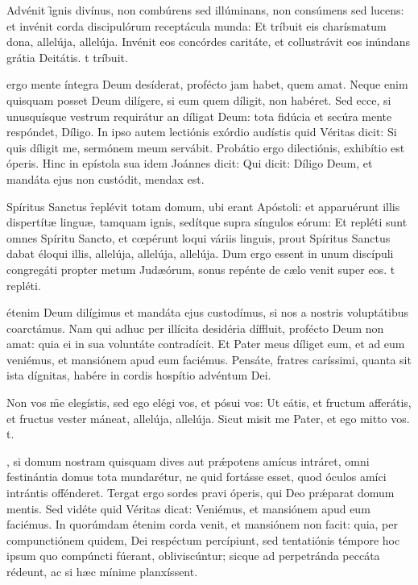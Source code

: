 \documentclass[fontsize=9pt,paper=A6,twoside,BCOR=1mm,DIV=22,headinclude]{scrarticle}
\begin{document}
\begin{multicols}{2}
\R Advénit \f ignis divínus, non combúrens sed illúminans, non consúmens sed lucens: et invénit corda discipulórum receptácula munda:
\red{*} Et tríbuit eis charísmatum dona, allelúja, allelúja.
\V Invénit eos concórdes caritáte, et collustrávit eos inúndans grátia Deitátis.
t tríbuit.

 ergo mente íntegra Deum desíderat, profécto jam habet, quem amat. Neque enim quisquam posset Deum dilígere, si eum quem díligit, non habéret. Sed ecce, si unusquísque vestrum requirátur an díligat Deum: tota fidúcia et secúra mente respóndet, Díligo. In ipso autem lectiónis exórdio audístis quid Véritas dicit: Si quis díligit me, sermónem meum servábit. Probátio ergo dilectiónis, exhibítio est óperis. Hinc in epístola sua idem Joánnes dicit: Qui dicit: Díligo Deum, et mandáta ejus non custódit, mendax est.

\R Spíritus Sanctus \f replévit totam domum, ubi erant Apóstoli: et apparuérunt illis dispertítæ linguæ, tamquam ignis, sedítque supra síngulos eórum:
\red{*} Et repléti sunt omnes Spíritu Sancto, et cœpérunt loqui váriis linguis, prout Spíritus Sanctus dabat éloqui illis, allelúja, allelúja, allelúja.
\V Dum ergo essent in unum discípuli congregáti propter metum Judæórum, sonus repénte de cælo venit super eos.
t repléti.

 étenim Deum dilígimus et mandáta ejus custodímus, si nos a nostris voluptátibus coarctámus. Nam qui adhuc per illícita desidéria díffluit, profécto Deum non amat: quia ei in sua voluntáte contradícit. Et Pater meus díliget eum, et ad eum veniémus, et mansiónem apud eum faciémus. Pensáte, fratres caríssimi, quanta sit ista dígnitas, habére in cordis hospítio advéntum Dei.

\R Non vos \f me elegístis, sed ego elégi vos, et pósui vos:
\red{*} Ut eátis, et fructum afferátis, et fructus vester máneat, allelúja, allelúja.
\V Sicut misit me Pater, et ego mitto vos.
t.

, si domum nostram quisquam dives aut prǽpotens amícus intráret, omni festinántia domus tota mundarétur, ne quid fortásse esset, quod óculos amíci intrántis offénderet. Tergat ergo sordes pravi óperis, qui Deo prǽparat domum mentis. Sed vidéte quid Véritas dicat: Veniémus, et mansiónem apud eum faciémus. In quorúmdam étenim corda venit, et mansiónem non facit: quia, per compunctiónem quidem, Dei respéctum percípiunt, sed tentatiónis témpore hoc ipsum quo compúncti fúerant, obliviscúntur; sicque ad perpetránda peccáta rédeunt, ac si hæc mínime planxíssent.


\end{multicols}
\end{document}

